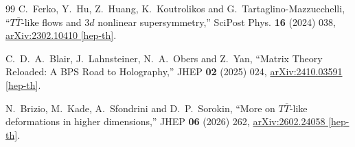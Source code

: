 \documentclass[a4paper,11pt]{ltjsarticle}
\numberwithin{equation}{section}
\begin{document}
\begin{thebibliography}{99}
C.~Ferko, Y.~Hu, Z.~Huang, K.~Koutrolikos and G.~Tartaglino-Mazzucchelli,
``$T\overline T$-like flows and $3d$ nonlinear supersymmetry,''
SciPost Phys. \textbf{16} (2024) 038,
\href{https://arxiv.org/abs/2302.10410}{arXiv:2302.10410 [hep-th]}.

C.~D.~A.~Blair, J.~Lahnsteiner, N.~A.~Obers and Z.~Yan,
``Matrix Theory Reloaded: A BPS Road to Holography,''
JHEP \textbf{02} (2025) 024,
\href{https://arxiv.org/abs/2410.03591}{arXiv:2410.03591 [hep-th]}.

N.~Brizio, M.~Kade, A.~Sfondrini and D.~P.~Sorokin,
``More on $T\overline T$-like deformations in higher dimensions,''
JHEP \textbf{06} (2026) 262,
\href{https://arxiv.org/abs/2602.24058}{arXiv:2602.24058 [hep-th]}.

\end{thebibliography}
\end{document}
